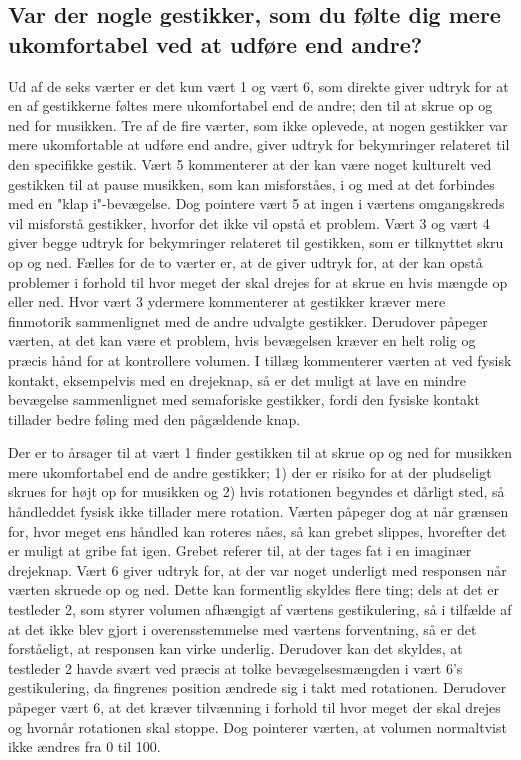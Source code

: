 \subsection{Var der nogle gestikker, som du følte dig mere ukomfortabel ved at udføre end andre?}
\label{TestresultaterSocialAcceptGestikkerUkomfortabelt}
%
Ud af de seks værter er det kun vært 1 og vært 6, som direkte giver udtryk for at en af gestikkerne føltes mere ukomfortabel end de andre; den til at skrue op og ned for musikken. Tre af de fire værter, som ikke oplevede, at nogen gestikker var mere ukomfortable at udføre end andre, giver udtryk for bekymringer relateret til den specifikke gestik. Vært 5 kommenterer at der kan være noget kulturelt ved gestikken til at pause musikken, som kan misforståes, i og med at det forbindes med en "klap i"-bevægelse. Dog pointere vært 5 at ingen i værtens omgangskreds vil misforstå gestikker, hvorfor det ikke vil opstå et problem. Vært 3 og vært 4 giver begge udtryk for bekymringer relateret til gestikken, som er tilknyttet skru op og ned. Fælles for de to værter er, at de giver udtryk for, at der kan opstå problemer i forhold til hvor meget der skal drejes for at skrue en hvis mængde op eller ned. Hvor vært 3 ydermere kommenterer at gestikker kræver mere finmotorik sammenlignet med de andre udvalgte gestikker. Derudover påpeger værten, at det kan være et problem, hvis bevægelsen kræver en helt rolig og præcis hånd for at kontrollere volumen. I tillæg kommenterer værten at ved fysisk kontakt, eksempelvis med en drejeknap, så er det muligt at lave en mindre bevægelse sammenlignet med semaforiske gestikker, fordi den fysiske kontakt tillader bedre føling med den pågældende knap. 

Der er to årsager til at vært 1 finder gestikken til at skrue op og ned for musikken mere ukomfortabel end de andre gestikker; 1) der er risiko for at der pludseligt skrues for højt op for musikken og 2) hvis rotationen begyndes et dårligt sted, så håndleddet fysisk ikke tillader mere rotation. Værten påpeger dog at når grænsen for, hvor meget ens håndled kan roteres nåes, så kan grebet slippes, hvorefter det er muligt at gribe fat igen. Grebet referer til, at der tages fat i en imaginær drejeknap. Vært 6 giver udtryk for, at der var noget underligt med responsen når værten skruede op og ned. Dette kan formentlig skyldes flere ting; dels at det er testleder 2, som styrer volumen afhængigt af værtens gestikulering, så i tilfælde af at det ikke blev gjort i overensstemmelse med værtens forventning, så er det forståeligt, at responsen kan virke underlig. Derudover kan det skyldes, at testleder 2 havde svært ved præcis at tolke bevægelsesmængden i vært 6's gestikulering, da fingrenes position ændrede sig i takt med rotationen. Derudover påpeger vært 6, at det kræver tilvænning i forhold til hvor meget der skal drejes og hvornår rotationen skal stoppe. Dog pointerer værten, at volumen normaltvist ikke ændres fra 0 til 100. 
%
